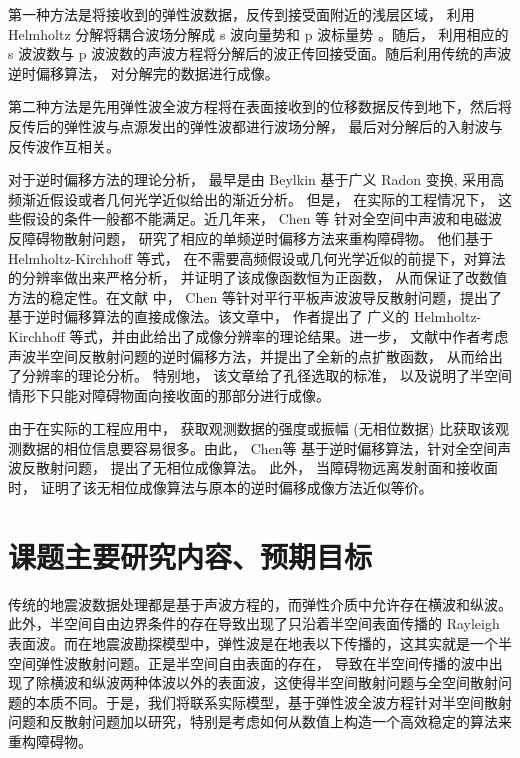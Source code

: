 第一种方法是将接收到的弹性波数据，反传到接受面附近的浅层区域， 利用 Helmholtz 分解将耦合波场分解成 s 波向量势和 p 波标量势 \cite{etgen1988prestacked,zhe1997prestack}。随后， 利用相应的 s 波波数与 p 波波数的声波方程将分解后的波正传回接受面。随后利用传统的声波逆时偏移算法， 对分解完的数据进行成像。

第二种方法是先用弹性波全波方程将在表面接收到的位移数据反传到地下，然后将反传后的弹性波与点源发出的弹性波都进行波场分解， 最后对分解后的入射波与反传波作互相关\cite{dellinger1990wave}。

对于逆时偏移方法的理论分析， 最早是由 Beylkin \cite{beylkin1984inversion,beylkin1985imaging,beylkin1990linearized} 基于广义 Radon 变换, 采用高
频渐近假设或者几何光学近似给出的渐近分析。 但是， 在实际的工程情况下， 这些假设的条件一般都不能满足。近几年来， Chen 等\cite{chen2013reverse_acou,chen2013reverse_elec,thesis_guanghui} 针对全空间中声波和电磁波反障碍物散射问题， 研究了相应的单频逆时偏移方法来重构障碍物。 他们基于  Helmholtz-Kirchhoff 等式， 在不需要高频假设或几何光学近似的前提下，对算法的分辨率做出来严格分析， 并证明了该成像函数恒为正函数， 从而保证了改数值方法的稳定性。在文献 \cite{chen2015reverse_planar} 中， Chen 等针对平行平板声波波导反散射问题，提出了基于逆时偏移算法的直接成像法。该文章中， 作者提出了 广义的 Helmholtz-Kirchhoff 等式，并由此给出了成像分辨率的理论结果。进一步， 文献\cite{RTMhalf_aco}中作者考虑声波半空间反散射问题的逆时偏移方法，并提出了全新的点扩散函数， 从而给出了分辨率的理论分析。 特别地， 该文章给了孔径选取的标准， 以及说明了半空间情形下只能对障碍物面向接收面的那部分进行成像。

由于在实际的工程应用中， 获取观测数据的强度或振幅 (无相位数据) 比获取该观测数据的相位信息要容易很多。由此， Chen等 \cite{chen2016direct,} 基于逆时偏移算法，针对全空间声波反散射问题， 提出了无相位成像算法。 此外， 当障碍物远离发射面和接收面时， 证明了该无相位成像算法与原本的逆时偏移成像方法近似等价。



\section{课题主要研究内容、预期目标}
 传统的地震波数据处理都是基于声波方程的，而弹性介质中允许存在横波和纵波。此外，半空间自由边界条件的存在导致出现了只沿着半空间表面传播的 Rayleigh 表面波。而在地震波勘探模型中，弹性波是在地表以下传播的，这其实就是一个半空间弹性波散射问题。正是半空间自由表面的存在， 导致在半空间传播的波中出现了除横波和纵波两种体波以外的表面波，这使得半空间散射问题与全空间散射问题的本质不同。于是，我们将联系实际模型，基于弹性波全波方程针对半空间散射问题和反散射问题加以研究，特别是考虑如何从数值上构造一个高效稳定的算法来重构障碍物。

